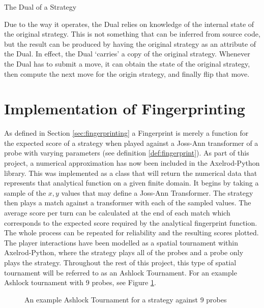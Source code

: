 \begin{algorithm}[H]
    \caption{The Dual of a Strategy}
\end{algorithm}

Due to the way it operates, the Dual relies on knowledge of the internal state of the original strategy.
This is not something that can be inferred from source code, but the result can be produced by having the original strategy as an attribute of the Dual.
In effect, the Dual `carries' a copy of the original strategy.
Whenever the Dual has to submit a move, it can obtain the state of the original strategy, then compute the next move for the origin strategy, and finally flip that move.



\section{Implementation of Fingerprinting}\label{sec:fingerprint-implementation}

As defined in Section \ref{sec:fingerprinting} a Fingerprint is merely a function for the expected score of a strategy when played against a Joss-Ann transformer of a probe with varying parameters (see definition \ref{def:fingerprint}).
As part of this project, a numerical approximation has now been included in the Axelrod-Python library.
This was implemented as a class that will return the numerical data that represents that analytical function on a given finite domain.
It begins by taking a sample of the $x,y$ values that may define a Joss-Ann Transformer.
The strategy then plays a match against a transformer with each of the sampled values.
The average score per turn can be calculated at the end of each match which corresponds to the expected score required by the analytical fingerprint function.
The whole process can be repeated for reliability and the resulting scores plotted.
The player interactions have been modelled as a spatial tournament within Axelrod-Python, where the strategy plays all of the probes and a probe only plays the strategy.
Throughout the rest of this project, this type of spatial tournament will be referred to as an Ashlock Tournament.
For an example Ashlock tournament with 9 probes, see Figure \ref{fig:spatialtourn}.

\begin{figure}[!hbtp]
    \begin{center}
        
        \caption{An example Ashlock Tournament for a strategy against 9 probes}\label{fig:spatialtourn}
    \end{center}
\end{figure}


